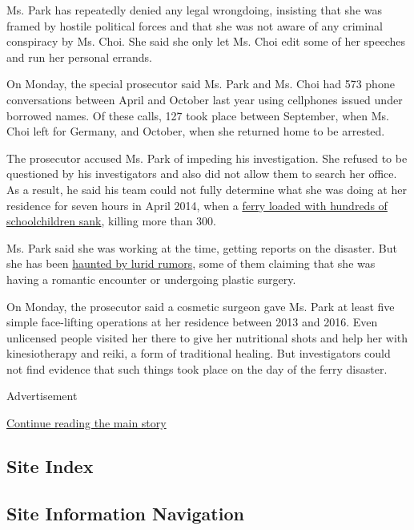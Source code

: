 Ms. Park has repeatedly denied any legal wrongdoing, insisting that she
was framed by hostile political forces and that she was not aware of any
criminal conspiracy by Ms. Choi. She said she only let Ms. Choi edit
some of her speeches and run her personal errands.

On Monday, the special prosecutor said Ms. Park and Ms. Choi had 573
phone conversations between April and October last year using cellphones
issued under borrowed names. Of these calls, 127 took place between
September, when Ms. Choi left for Germany, and October, when she
returned home to be arrested.

The prosecutor accused Ms. Park of impeding his investigation. She
refused to be questioned by his investigators and also did not allow
them to search her office. As a result, he said his team could not fully
determine what she was doing at her residence for seven hours in April
2014, when a
\href{https://www.nytimes3xbfgragh.onion/2014/04/17/world/asia/south-korean-ferry-accident.html}{ferry
loaded with hundreds of schoolchildren sank}, killing more than 300.

Ms. Park said she was working at the time, getting reports on the
disaster. But she has been
\href{https://www.nytimes3xbfgragh.onion/2015/12/18/world/asia/south-korea-park-geun-hye-defamation-verdict.html}{haunted
by lurid rumors}, some of them claiming that she was having a romantic
encounter or undergoing plastic surgery.

On Monday, the prosecutor said a cosmetic surgeon gave Ms. Park at least
five simple face-lifting operations at her residence between 2013 and
2016. Even unlicensed people visited her there to give her nutritional
shots and help her with kinesiotherapy and reiki, a form of traditional
healing. But investigators could not find evidence that such things took
place on the day of the ferry disaster.

Advertisement

\protect\hyperlink{after-bottom}{Continue reading the main story}

\hypertarget{site-index}{%
\subsection{Site Index}\label{site-index}}

\hypertarget{site-information-navigation}{%
\subsection{Site Information
Navigation}\label{site-information-navigation}}

